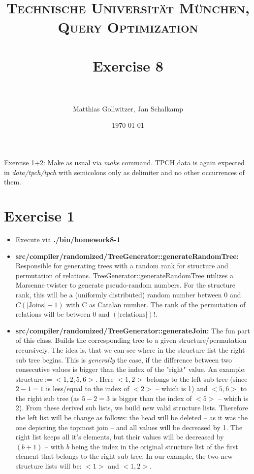 \documentclass[paper=a4, fontsize=11pt]{scrartcl} %
\title{	
\normalfont \normalsize 
\textsc{Technische Universit\"at M\"unchen, Query Optimization} \\ [25pt] %
\horrule{0.5pt} \\[0.4cm] %
\huge Exercise 8 \\ %
\horrule{2pt} \\[0.5cm] %
}
\author{Matthias Gollwitzer, Jan Schalkamp} %
\date{\normalsize\today} %
\numberwithin{equation}{section} %
\numberwithin{figure}{section} %
\numberwithin{table}{section} %
\begin{document}
\lstset{language=SQL}
\maketitle %


Exercise 1+2: Make as usual via \textit{make} command. TPCH data is again expected in \textit{data/tpch/tpch} with semicolons only as delimiter and no other occurrences of them.
\section{Exercise 1}
	\begin{itemize}
		\item Execute via \textbf{./bin/homework8-1}
		\item \textbf{src/compiler/randomized/TreeGenerator::generateRandomTree:} Responsible for generating trees with a random rank for structure and permutation of relations. TreeGenerator::generateRandomTree utilizes a Marsenne twister to generate pseudo-random numbers. For the structure rank, this will be a (uniformly distributed) random number between 0 and $C(|\text{Joins}| - 1)$ with C as Catalan number. The rank of the permutation of relations will be between 0 and $(|\text{relations}|)!$. 
		\item \textbf{src/compiler/randomized/TreeGenerator::generateJoin:} The fun part of this class. Builds the corresponding tree to a given structure/permutation recursively. The idea is, that we can see where in the structure list the right sub tree begins. This is \textit{generally} the case, if the difference between two consecutive values is bigger than the index of the "right" value. An example: $\text{structure} := <1,2,5,6>$. Here $<1,2>$ belongs to the left sub tree (since $2-1=1$ is less/equal to the index of $<2>$ -- which is 1) and $<5,6>$ to the right sub tree (as $5-2=3$ is bigger than the index of $<5>$ -- which is 2). From these derived sub lists, we build new valid structure lists. Therefore the left list will be change as follows: the head will be deleted -- as it was the one depicting the topmost join -- and all values will be decreased by 1. The right list keeps all it's elements, but their values will be decreased by $(b+1)$ -- with $b$ being the index in the original structure list of the first element that belongs to the right sub tree. In our example, the two new structure lists will be: $<1>$ and $<1,2>$. 

\end{itemize}
\end{document}
